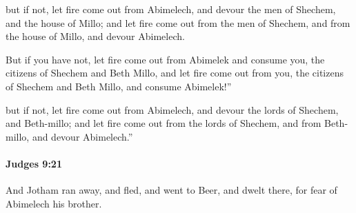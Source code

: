 			\begin{versebox}
					\item[BHS] 
					\item[ASV] but if not, let fire come out from Abimelech, and devour the men of Shechem, and the house of Millo; and let fire come out from the men of Shechem, and from the house of Millo, and devour Abimelech.
					\item[NIV] But if you have not, let fire come out from Abimelek and consume you, the citizens of Shechem and Beth Millo, and let fire come out from you, the citizens of Shechem and Beth Millo, and consume Abimelek!”
					\item[NRSV] but if not, let fire come out from Abimelech, and devour the lords of Shechem, and Beth-millo; and let fire come out from the lords of Shechem, and from Beth-millo, and devour Abimelech.”
			\end{versebox}

		\paragraph{Judges 9:21} %
			\label{JUDGES-9-21}

			And Jotham ran away, and fled, and went to Beer, and dwelt there, for fear of Abimelech his brother.

